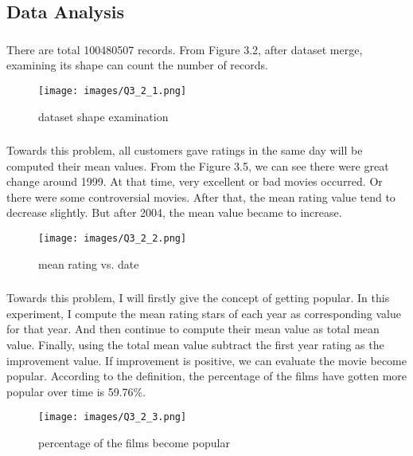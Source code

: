 \documentclass[paper=a4, fontsize=11pt]{scrartcl} %
\begin{document}
\subsection{Data Analysis}
\label{sec:data-analysis}

\subsubsection{}
There are total 100480507 records. From Figure 3.2, after dataset merge, examining its shape can count the number of records.
\begin{figure}[htbp]
    \centering
    \texttt{[image: images/Q3\_2\_1.png]}
    \caption{dataset shape examination}
    \label{fig:data-files}
    \end{figure}

\subsubsection{}
Towards this problem, all customers gave ratings in the same day will be computed their mean values. From the Figure 3.5, we can see there were great change around 1999. At that time, very excellent or bad movies occurred. Or there were some controversial movies. After that, the mean rating value tend to decrease slightly. But after 2004, the mean value became to increase.
\begin{figure}[htbp]
    \centering
    \texttt{[image: images/Q3\_2\_2.png]}
    \caption{mean rating vs. date}
    \label{fig:data-files}
    \end{figure}

\subsubsection{}
Towards this problem, I will firstly give the concept of getting popular. In this experiment, I compute the mean rating stars of each year as corresponding value for that year. And then continue to compute their mean value as total mean value. Finally, using the total mean value subtract the first year rating
as the improvement value. If improvement is positive, we can evaluate the movie become popular. According to the definition, the percentage of the films have gotten more popular over time is 59.76\%.
\begin{figure}[htbp]
\centering
\texttt{[image: images/Q3\_2\_3.png]}
\caption{percentage of the films become popular}
\label{fig:data-files}
\end{figure}
\end{document}

